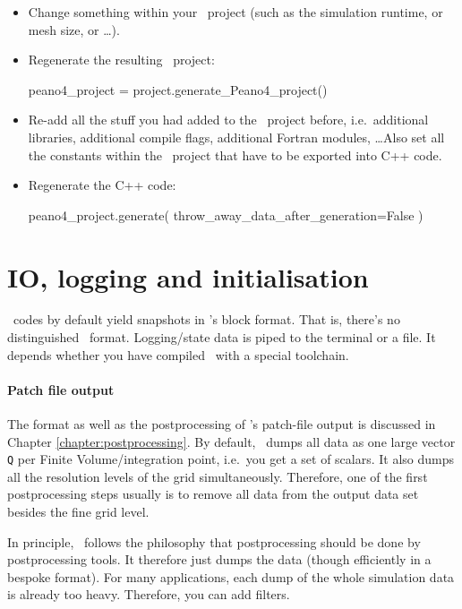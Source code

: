 \begin{itemize}
  \item Change something within your \ExaHyPE\ project (such as the simulation
  runtime, or mesh size, or \ldots).
  \item Regenerate the resulting \Peano\ project: 
  \begin{code}
peano4_project = project.generate_Peano4_project()
  \end{code}
  \item Re-add all the stuff you had added to the \Peano\ project before,
  i.e.~additional libraries, additional compile flags, additional
  Fortran modules, \ldots Also set all the constants within the \Peano\ project
  that have to be exported into C++ code.
  \item Regenerate the C++ code:
  \begin{code}
peano4_project.generate( throw_away_data_after_generation=False )  
  \end{code}
\end{itemize}



\section{IO, logging and initialisation}


\ExaHyPE\ codes by default yield snapshots in \Peano's block format. 
That is, there's no distinguished \ExaHyPE\ format. 
Logging/state data is piped to the terminal or a file. 
It depends whether you have compiled \Peano\ with a special toolchain.


\paragraph{Patch file output}

The format as well as the postprocessing of \Peano's patch-file output is
discussed in Chapter \ref{chapter:postprocessing}.
By default, \ExaHyPE\ dumps all data as one large vector \texttt{Q} per Finite
Volume/integration point, i.e.~you get a set of scalars.
It also dumps all the resolution levels of the grid simultaneously.
Therefore, one of the first postprocessing steps usually is to remove all data
from the output data set besides the fine grid level.


\begin{remark}
 In principle, \Peano\ follows the philosophy that postprocessing should be done
 by postprocessing tools. It therefore just dumps the data (though efficiently
 in a bespoke format). For many applications, each dump of the whole
 simulation data is already too heavy. Therefore, you can add filters.
\end{remark}

